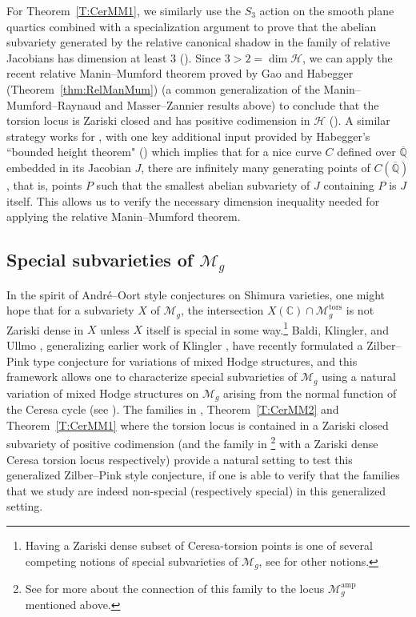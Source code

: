 \documentclass[reqno,10pt]{amsart}
\theoremstyle{definition}
\theoremstyle{definition}
\def\Qbar{\overline{\mathbb{Q}}}
\DeclareMathOperator{\tors}{tors}
\DeclareMathOperator{\amp}{amp}
\begin{document}
For Theorem~\ref{T:CerMM1}, we similarly use the $S_3$ action on the smooth plane quartics combined with a specialization argument to prove that the abelian subvariety generated by the relative canonical shadow in the family of relative Jacobians has dimension at least $3$ ().  Since $3 > 2 = \dim \mathcal{H}$, we can apply the recent relative Manin--Mumford theorem proved by Gao and Habegger (Theorem~\ref{thm:RelManMum}) (a common generalization of the Manin--Mumford--Raynaud and Masser--Zannier results above) to conclude that the torsion locus is Zariski closed and has positive codimension in $\mathcal{H}$ (). A similar strategy works for , with one key additional input provided by Habegger's ``bounded height theorem" () which implies that for a nice curve $C$ defined over $\Qbar$ embedded in its Jacobian $J$, there are infinitely many generating points of $C(\Qbar)$, that is, points $P$ such that the smallest abelian subvariety of $J$ containing $P$ is $J$ itself. This allows us to verify the necessary dimension inequality needed for applying the relative Manin--Mumford theorem. 

\subsection*{Special subvarieties of $\mathcal{M}_g$} 
In the spirit of Andr\'{e}--Oort style conjectures on Shimura varieties, one might hope that for a subvariety $X$ of $\mathcal{M}_g$, the intersection $X(\mathbb{C}) \cap {\mathcal{M}}_{g}^{\tors}$ is not Zariski dense in $X$ unless $X$ itself is special in some way.\footnote{Having a Zariski dense subset of Ceresa-torsion points is one of several competing notions of special subvarieties of $\mathcal{M}_g$, see \cite{Baldi} for other notions.} Baldi, Klingler, and Ullmo \cite[Conjecture~5.12]{BKU}, generalizing earlier work of Klingler \cite[Section~1.5]{Klingler}, have recently formulated a Zilber--Pink type conjecture for variations of  mixed Hodge structures, and this framework allows one to characterize  special subvarieties of $\mathcal{M}_g$ using a natural variation of mixed Hodge structures on $\mathcal{M}_g$ arising from the normal function of the Ceresa cycle (see \cite[Section~2]{KerrTayou}). The families in , Theorem~\ref{T:CerMM2} and Theorem~\ref{T:CerMM1} where the torsion locus is contained in a  Zariski closed subvariety of positive codimension (and the family in \cite[Theorem~D]{AriJef2}\footnote{See \cite[Example~4.3]{KerrTayou} for more about the connection of this family to the locus $\mathcal{M}_g^{\amp}$ mentioned above.} with a Zariski dense Ceresa torsion locus respectively) provide a natural setting to test this generalized Zilber--Pink style conjecture, if one is able to verify that the families that we study are indeed non-special (respectively special) in this generalized setting.
\end{document}
